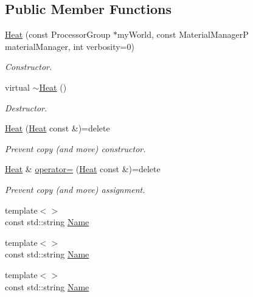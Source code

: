 \subsection*{Public Member Functions}
\begin{DoxyCompactItemize}
\item 
\hyperlink{classUintah_1_1PhaseField_1_1Heat_a034a847cbfa1066a8d3b31227916f659}{Heat} (const Processor\+Group $\ast$my\+World, const Material\+ManagerP material\+Manager, int verbosity=0)
\begin{DoxyCompactList}\small\item\em Constructor. \end{DoxyCompactList}\item 
virtual \hyperlink{classUintah_1_1PhaseField_1_1Heat_a8b89b4df8ce06c26379b8463efea4652}{$\sim$\+Heat} ()
\begin{DoxyCompactList}\small\item\em Destructor. \end{DoxyCompactList}\item 
\hyperlink{classUintah_1_1PhaseField_1_1Heat_a28cfb869ac32900e8f683abac43aa353}{Heat} (\hyperlink{classUintah_1_1PhaseField_1_1Heat}{Heat} const \&)=delete
\begin{DoxyCompactList}\small\item\em Prevent copy (and move) constructor. \end{DoxyCompactList}\item 
\hyperlink{classUintah_1_1PhaseField_1_1Heat}{Heat} \& \hyperlink{classUintah_1_1PhaseField_1_1Heat_ad93a7ce5e5ad3a18808f63846dd309cd}{operator=} (\hyperlink{classUintah_1_1PhaseField_1_1Heat}{Heat} const \&)=delete
\begin{DoxyCompactList}\small\item\em Prevent copy (and move) assignment. \end{DoxyCompactList}\item 
{\footnotesize template$<$$>$ }\\const std\+::string \hyperlink{classUintah_1_1PhaseField_1_1Heat_a6afff0c96eebbecf6ff2dd24d343833f}{Name}
\item 
{\footnotesize template$<$$>$ }\\const std\+::string \hyperlink{classUintah_1_1PhaseField_1_1Heat_a214c05a905e1fca240598408207c7bf5}{Name}
\item 
{\footnotesize template$<$$>$ }\\const std\+::string \hyperlink{classUintah_1_1PhaseField_1_1Heat_ae1663b72cb7781cb2ed3822403303665}{Name}

\end{DoxyCompactItemize}
